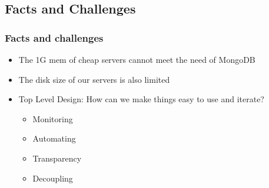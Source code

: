 \documentclass{beamer}
\begin{document}
\subsection{Facts and Challenges}
\begin{frame}
\frametitle{Facts and challenges}
\begin{itemize} \small
  \item The 1G mem of cheap servers cannot meet the need of MongoDB
  \item The disk size of our servers is also limited
  \item Top Level Design: How can we make things easy to use and iterate?
  \begin{itemize}
    \item Monitoring
    \item Automating
    \item Transparency
    \item Decoupling
  \end{itemize}
\end{itemize}
\end{frame}
\end{document}
